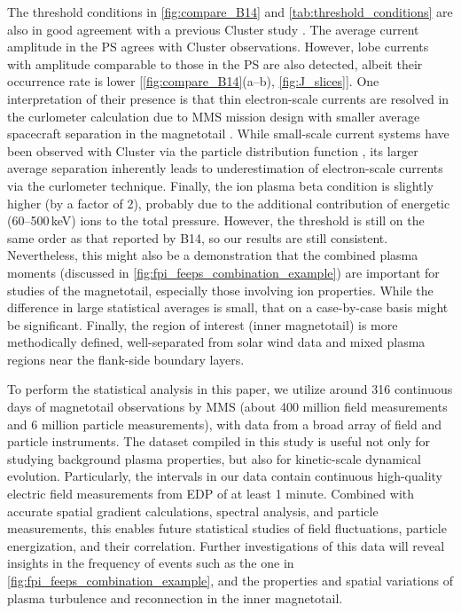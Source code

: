 \documentclass[draft]{agujournal2019}
\begin{document}
The threshold conditions in \cref{fig:compare_B14} and \cref{tab:threshold_conditions} are also in good agreement with a previous Cluster study \cite{Boakes2014}. The average current amplitude in the PS agrees with Cluster observations. However, lobe currents with amplitude comparable to those in the PS are also detected, albeit their occurrence rate is lower [\mbox{\cref{fig:compare_B14}(a--b)}, \mbox{\cref{fig:J_slices}}]. One interpretation of their presence is that thin electron-scale currents are resolved in the curlometer calculation due to MMS mission design with smaller average spacecraft separation in the magnetotail \mbox{\cite{Paschmann1998,Dunlop2021}}. While small-scale current systems have been observed with Cluster via the particle distribution function \mbox{\cite{Teste2007}}, its larger average separation inherently leads to underestimation of electron-scale currents via the curlometer technique. Finally, the ion plasma beta condition is slightly higher (by a factor of 2), probably due to the additional contribution of energetic (60--500\,\si{keV}) ions to the total pressure. However, the threshold is still on the same order as that reported by B14, so our results are still consistent. Nevertheless, this might also be a demonstration that the combined plasma moments (discussed in \cref{fig:fpi_feeps_combination_example}) are important for studies of the magnetotail, especially those involving ion properties. While the difference in large statistical averages is small, that on a case-by-case basis might be significant. Finally, the region of interest (inner magnetotail) is more methodically defined, well-separated from solar wind data and mixed plasma regions near the flank-side boundary layers.

To perform the statistical analysis in this paper, we utilize around 316 continuous days of magnetotail observations by MMS (about 400 million field measurements and 6 million particle measurements), with data from a broad array of field and particle instruments. The dataset compiled in this study is useful not only for studying background plasma properties, but also for kinetic-scale dynamical evolution. Particularly, the intervals in our data contain continuous high-quality electric field measurements from EDP of at least 1 minute. Combined with accurate spatial gradient calculations, spectral analysis, and particle measurements, this enables future statistical studies of field fluctuations, particle energization, and their correlation. Further investigations of this data will reveal insights in the frequency of events such as the one in \cref{fig:fpi_feeps_combination_example}, and the properties and spatial variations of plasma turbulence and reconnection in the inner magnetotail.
\end{document}
